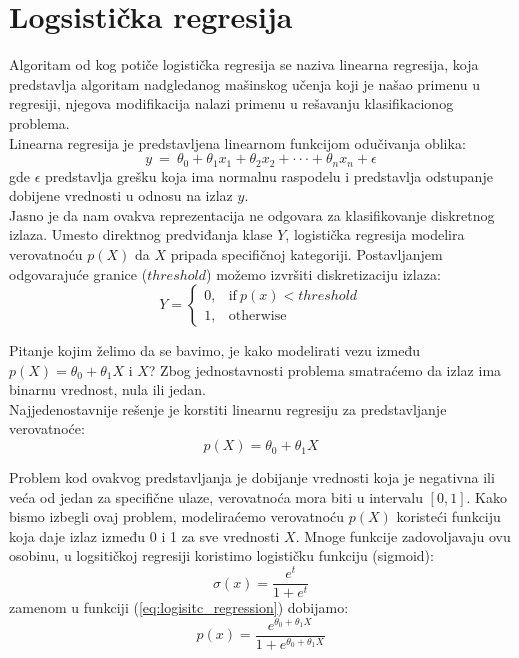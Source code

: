 \section{Logsistička regresija}
Algoritam od kog potiče logistička regresija se naziva linearna regresija,
koja predstavlja algoritam nadgledanog mašinskog učenja koji je našao primenu u
regresiji, njegova modifikacija nalazi primenu u rešavanju klasifikacionog
problema.  \\

Linearna regresija je predstavljena linearnom funkcijom odučivanja oblika:
\begin{equation}
  y \ = \ \theta_0 + \theta_1 x_1 + \theta_2 x_2 + \cdot\cdot\cdot + \theta_n x_n + \epsilon
\end{equation}
gde $\epsilon$ predstavlja grešku koja ima normalnu raspodelu i predstavlja odstupanje
dobijene vrednosti u odnosu na izlaz $y$. \\

Jasno je da nam ovakva reprezentacija ne odgovara za klasifikovanje diskretnog
izlaza. Umesto direktnog predviđanja klase $Y$, logistička regresija modelira
verovatnoću $p\left(X\right)$ da $X$ pripada specifičnoj kategoriji.
Postavljanjem odgovarajuće granice ($threshold$) možemo izvršiti diskretizaciju
izlaza:
\begin{equation}
  Y =
    \begin{cases}
      0, & \text{if}\ p\left(x\right) < threshold \\
      1, & \text{otherwise}\
    \end{cases}
\end{equation}

Pitanje kojim želimo da se bavimo, je kako modelirati vezu između
$p\left(X\right) = \theta_0 + \theta_1  X$ i $X$? Zbog jednostavnosti problema
smatraćemo da izlaz ima binarnu vrednost, nula ili jedan. \\

Najjedenostavnije rešenje je korstiti linearnu regresiju za predstavljanje
verovatnoće:
\begin{equation} \label{eq:logisitc_regression}
  p\left(X\right) = \theta_0 + \theta_1 X
\end{equation}

Problem kod ovakvog predstavljanja je dobijanje vrednosti koja je negativna ili
veća od jedan za specifične ulaze, verovatnoća mora biti u intervalu $[0, 1]$.
Kako bismo izbegli ovaj problem, modeliraćemo verovatnoću $p\left(X\right)$ koristeći
funkciju koja daje izlaz između 0 i 1 za sve vrednosti $X$. Mnoge funkcije
zadovoljavaju ovu osobinu, u logsitičkoj regresiji koristimo logističku funkciju
(sigmoid):
\begin{equation}
  \sigma\left(x\right)=\frac{e^{t}}{1+e^{t}}
\end{equation}
zamenom u funkciji (\ref{eq:logisitc_regression}) dobijamo:
\begin{equation} \label{eq:p_x_logit}
  p\left(x\right) = \frac{e^{\theta_0 + \theta_1  X}}{1 + e^{\theta_0 + \theta_1  X}}
\end{equation}

